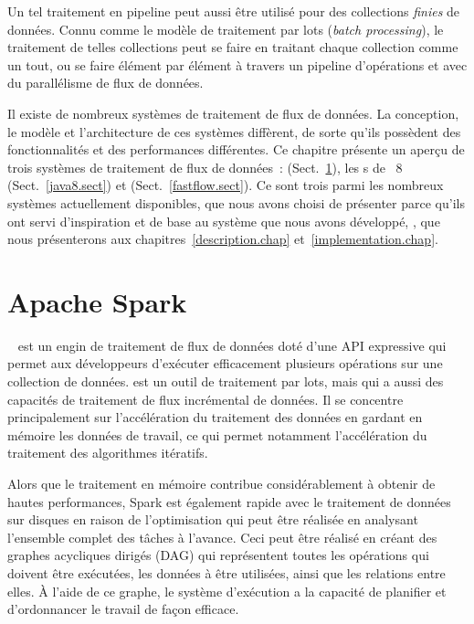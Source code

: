 Un tel traitement en pipeline peut aussi \^etre utilis\'e pour des collections \emph{finies} de donn\'ees. Connu comme le mod\`ele de traitement par lots (\emph{batch processing}), le traitement de telles collections peut se faire en traitant chaque collection comme un tout, ou se faire \'el\'ement par \'el\'ement \`a travers un pipeline d'op\'erations et avec du parall\'elisme de flux de donn\'ees.


Il existe de nombreux syst\`emes de traitement de flux de donn\'ees. La conception, le mod\`ele et l'architecture de ces syst\`emes diff\`erent, de sorte qu'ils poss\`edent des fonctionnalit\'es et des performances diff\'erentes. Ce chapitre pr\'esente un aper\c{c}u de trois syst\`emes de traitement de flux de donn\'ees~:  (Sect.~\ref{spark.sect}), les s de ~8 (Sect.~\ref{java8.sect}) et  (Sect.~\ref{fastflow.sect}).  Ce sont trois parmi les nombreux syst\`emes actuellement disponibles, que nous avons choisi de pr\'esenter parce qu'ils ont servi d'inspiration et de base au syst\`eme que nous avons d\'evelopp\'e, \ppff, que nous pr\'esenterons aux chapitres~\ref{description.chap} et~\ref{implementation.chap}.


\section{Apache Spark}

\label{spark.sect}


~\citep{apachSpark} est un engin de traitement de flux de donn\'ees dot\'e d'une API expressive qui permet aux d\'eveloppeurs d'ex\'ecuter efficacement plusieurs op\'erations sur une collection de donn\'ees.  est un outil de traitement par lots, mais qui a aussi des capacit\'es de traitement de flux incr\'emental de donn\'ees. Il se concentre principalement sur l'acc\'el\'eration du traitement des donn\'ees en gardant en m\'emoire les donn\'ees de travail, ce qui permet notamment l'acc\'el\'eration du traitement des algorithmes it\'eratifs.

Alors que le traitement en m\'emoire contribue consid\'erablement \`a obtenir de hautes performances, Spark est \'egalement rapide avec le traitement de donn\'ees sur disques en raison de l'optimisation qui peut \^etre r\'ealis\'ee en analysant l'ensemble complet des t\^aches \`a l'avance. Ceci peut \^etre r\'ealis\'e en cr\'eant des graphes acycliques dirig\'es (DAG) qui repr\'esentent toutes les op\'erations qui doivent \^etre ex\'ecut\'ees, les donn\'ees \`a \^etre utilis\'ees, ainsi que les relations entre elles. \`A l'aide de ce graphe, le syst\`eme d'ex\'ecution a la capacit\'e de planifier et d'ordonnancer le travail de fa\c{c}on efficace.

